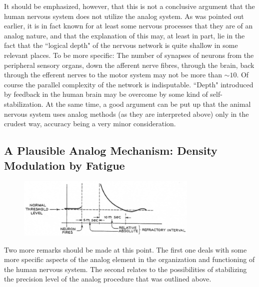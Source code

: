 \documentclass[twocolumn,preprintnumbers,amsmath,amssymb,floatfix]{revtex4}
\begin{document}
It should be emphasized, however, that this is not a conclusive
argument that the human nervous system does not utilize the analog
system. As was pointed out earlier, it is in fact known for at
least some nervous processes that they are of an analog nature,
and that the explanation of this may, at least in part, lie in the
fact that the ``logical depth" of the nervous network is quite
shallow in some relevant places. To be more specific: The number
of synapses of neurons from the peripheral sensory organs, down
the afferent nerve fibres, through the brain, back through the
efferent nerves to the motor system may not be more than $\sim10$.
Of course the parallel complexity of the network is indisputable.
``Depth" introduced by feedback in the human brain may be overcome
by some kind of self-stabilization. At the same time, a good
argument can be put up that the animal nervous system uses analog
methods (as they are interpreted above) only in the crudest way,
accuracy being a very minor consideration.

\subsection{\label{sec:twelve5}A Plausible Analog Mechanism: Density Modulation by Fatigue}

\begin{figure}
\includegraphics[width=3.4in]{fig_42}
\caption{\label{fig:42}}
\end{figure}

Two more remarks should be made at this point. The first one deals
with some more specific aspects of the analog element in the
organization and functioning of the human nervous system. The
second relates to the possibilities of stabilizing the precision
level of the analog procedure that was outlined above.
\end{document}
